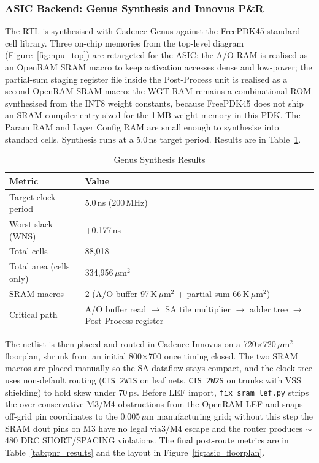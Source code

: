 \subsubsection{ASIC Backend: Genus Synthesis and Innovus P\&R}
\label{sec:hw:backend:asic}

The RTL is synthesised with Cadence Genus against the FreePDK45 standard-cell library. Three on-chip memories from the top-level diagram (Figure~\ref{fig:npu_top}) are retargeted for the ASIC: the A/O RAM is realised as an OpenRAM SRAM macro to keep activation accesses dense and low-power; the partial-sum staging register file inside the Post-Process unit is realised as a second OpenRAM SRAM macro; the WGT RAM remains a combinational ROM synthesised from the INT8 weight constants, because FreePDK45 does not ship an SRAM compiler entry sized for the 1\,MB weight memory in this PDK. The Param RAM and Layer Config RAM are small enough to synthesise into standard cells. Synthesis runs at a 5.0\,ns target period. Results are in Table~\ref{tab:syn_results}.

\begin{table}[H]
\centering
\caption{Genus Synthesis Results}
\label{tab:syn_results}
\begin{tabularx}{0.85\textwidth}{l X}
\toprule
\textbf{Metric} & \textbf{Value} \\
\midrule
Target clock period   & 5.0\,ns (200\,MHz) \\
Worst slack (WNS)     & +0.177\,ns \\
Total cells           & 88{,}018 \\
Total area (cells only) & 334{,}956\,$\mu$m$^2$ \\
SRAM macros           & 2 (A/O buffer 97\,K\,$\mu$m$^2$ + partial-sum 66\,K\,$\mu$m$^2$) \\
Critical path         & A/O buffer read $\rightarrow$ SA tile multiplier $\rightarrow$ adder tree $\rightarrow$ Post-Process register \\
\bottomrule
\end{tabularx}
\end{table}

The netlist is then placed and routed in Cadence Innovus on a 720$\times$720\,$\mu$m$^2$ floorplan, shrunk from an initial 800$\times$700 once timing closed. The two SRAM macros are placed manually so the SA dataflow stays compact, and the clock tree uses non-default routing (\texttt{CTS\_2W1S} on leaf nets, \texttt{CTS\_2W2S} on trunks with VSS shielding) to hold skew under 70\,ps. Before LEF import, \texttt{fix\_sram\_lef.py} strips the over-conservative M3/M4 obstructions from the OpenRAM LEF and snaps off-grid pin coordinates to the 0.005\,$\mu$m manufacturing grid; without this step the SRAM dout pins on M3 have no legal via3/M4 escape and the router produces $\sim$480 DRC SHORT/SPACING violations. The final post-route metrics are in Table~\ref{tab:pnr_results} and the layout in Figure~\ref{fig:asic_floorplan}.


